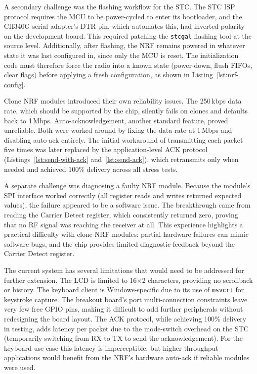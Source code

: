 \documentclass[12pt, a4paper]{article}
\begin{document}
A secondary challenge was the flashing workflow for the STC. The STC ISP protocol requires the MCU to be power-cycled to enter its bootloader, and the CH340G serial adapter's DTR pin, which automates this, had inverted polarity on the development board. This required patching the \texttt{stcgal} flashing tool at the source level. Additionally, after flashing, the NRF remains powered in whatever state it was last configured in, since only the MCU is reset. The initialization code must therefore force the radio into a known state (power-down, flush FIFOs, clear flags) before applying a fresh configuration, as shown in Listing~\ref{lst:nrf-config}.

Clone NRF modules introduced their own reliability issues. The 250\,kbps data rate, which should be supported by the chip, silently fails on clones and defaults back to 1\,Mbps. Auto-acknowledgement, another standard feature, proved unreliable. Both were worked around by fixing the data rate at 1\,Mbps and disabling auto-ack entirely. The initial workaround of transmitting each packet five times was later replaced by the application-level ACK protocol (Listings~\ref{lst:send-with-ack} and~\ref{lst:send-ack}), which retransmits only when needed and achieved 100\% delivery across all stress tests.

A separate challenge was diagnosing a faulty NRF module. Because the module's SPI interface worked correctly (all register reads and writes returned expected values), the failure appeared to be a software issue. The breakthrough came from reading the Carrier Detect register, which consistently returned zero, proving that no RF signal was reaching the receiver at all. This experience highlights a practical difficulty with clone NRF modules: partial hardware failures can mimic software bugs, and the chip provides limited diagnostic feedback beyond the Carrier Detect register.

The current system has several limitations that would need to be addressed for further extension. The LCD is limited to 16$\times$2 characters, providing no scrollback or history. The keyboard client is Windows-specific due to its use of \texttt{msvcrt} for keystroke capture. The breakout board's port multi-connection constraints leave very few free GPIO pins, making it difficult to add further peripherals without redesigning the board layout. The ACK protocol, while achieving 100\% delivery in testing, adds latency per packet due to the mode-switch overhead on the STC (temporarily switching from RX to TX to send the acknowledgement). For the keyboard use case this latency is imperceptible, but higher-throughput applications would benefit from the NRF's hardware auto-ack if reliable modules were used.
\end{document}
